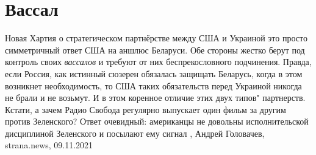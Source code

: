  
 
 
 
 
\chapter{Вассал}

Новая Хартия о стратегическом партнёрстве между США и Украиной это просто
симметричный ответ США на аншлюс Беларуси. Обе стороны жестко берут под
контроль своих \emph{вассалов} и требуют от них беспрекословного подчинения.
Правда, если Россия, как истинный сюзерен обязалась защищать Беларусь, когда в
этом возникнет необходимость, то США таких обязательств перед Украиной никогда
не брали и не возьмут. И в этом коренное отличие этих двух типов" партнерств.
Кстати, а зачем Радио Свобода регулярно выпускает один фильм за другим против
Зеленского? Ответ очевидный: американцы не довольны исполнительской дисциплиной
Зеленского и посылают ему сигнал
, 
Андрей Головачев, strana.news, 09.11.2021
